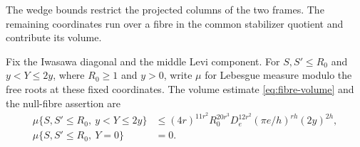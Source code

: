 The wedge bounds restrict the projected columns of the two frames. The remaining coordinates run over a fibre in the common stabilizer quotient and contribute its volume.

\begin{proposition}\label{prop:root-fibre-volume}
Fix the Iwasawa diagonal and the middle Levi component.
For \(S,S'\le R_0\) and \(y<Y\le2y\), where \(R_0\ge1\) and \(y>0\),
write \(\mu\) for Lebesgue measure modulo the free roots at these fixed coordinates. The volume estimate \eqref{eq:fibre-volume} and the null-fibre assertion are 
\[
 \begin{aligned}\mu\{S,S'\le R_0,\ y<Y\le2y\}&\le(4r)^{11r^2}R_0^{20r^3}D_e^{12r^2}(\pi e/h)^{rh}(2y)^{2h},\\ \mu\{S,S'\le R_0,\ Y=0\}&=0.\end{aligned}
\]

\end{proposition}

